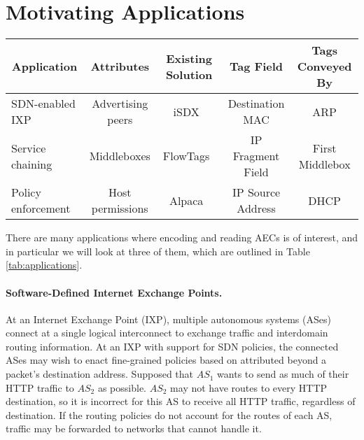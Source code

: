 

\section{Motivating Applications}\label{sec:motivation}
\begin{table*}[t]
\begin{center}
    \begin{tabular}{|l|c|c|c|c|}
    \hline
    \multicolumn{1}{|c|}{\bf Application} & 
    \multicolumn{1}{c|}{\bf Attributes} & 
    \multicolumn{1}{c|}{\bf Existing Solution} & 
    \multicolumn{1}{c|}{\bf Tag Field} & 
    \multicolumn{1}{c|}{\bf Tags Conveyed By}\\ \hline
    SDN-enabled IXP & Advertising peers & iSDX~\cite{isdx} & Destination MAC & ARP \\ \hline
    Service chaining & Middleboxes & FlowTags~\cite{flowtags} & IP Fragment Field & First Middlebox \\ \hline
    Policy enforcement & Host permissions & Alpaca~\cite{alpaca} & IP Source Address & DHCP \\ \hline
    \end{tabular}
\end{center}
    \caption{Example applications and systems which have solved them by some form of tagging.} 
    \label{tab:applications}
\end{table*}

There are many applications where encoding and reading AECs is of interest, and in particular we will look at three of them, which are outlined in Table \ref{tab:applications}.
 
\paragraph{Software-Defined Internet Exchange Points.}
At an Internet Exchange Point (IXP), multiple autonomous systems (ASes)
connect at a single logical interconnect to exchange traffic and
interdomain routing information.  At an IXP with support for SDN
policies, the connected ASes may wish to enact fine-grained 
policies based on attributed beyond a packet's destination
address. Supposed that $AS_1$ wants to send as much of their HTTP traffic
to $AS_2$ as possible. $AS_2$ may not have routes to every HTTP
destination, so it is incorrect for this AS to receive all HTTP traffic,
regardless of destination. If
the routing policies do not account for the routes of each AS, traffic
may be forwarded to networks that cannot handle it.

